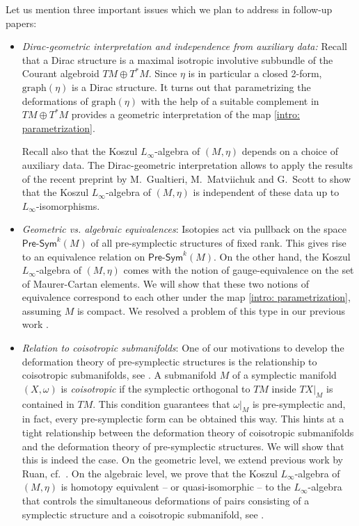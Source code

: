 \documentclass[11pt,thmsa]{amsart}
\theoremstyle{definition}
\newcommand{\Presym}{\mathsf{Pre}\textrm{-}\mathsf{Sym}}
\begin{document}
Let us mention three important issues which we plan to address in follow-up papers:


  
\begin{itemize}

\item {\em Dirac-geometric interpretation and independence from auxiliary data:} 
Recall that a Dirac structure is a  maximal isotropic involutive subbundle of the Courant algebroid $TM\oplus T^*M$. Since $\eta$ is in particular a closed 2-form,   $\mathrm{graph}(\eta)$ is a Dirac structure. It turns out {\cite{SZDirac}} 
that parametrizing the deformations of $\mathrm{graph}(\eta)$  with the help of a suitable complement in $TM\oplus T^*M$ provides a geometric interpretation of the map \eqref{intro: parametrization}. 



Recall also that the Koszul $L_{\infty}$-algebra of $(M,\eta)$  depends on a choice of auxiliary data. {The Dirac-geometric interpretation allows to apply the results of 
the recent preprint \cite{GMS} by M.~Gualtieri, M.~Matviichuk and G.~Scott to show that 
the Koszul $L_{\infty}$-algebra of $(M,\eta)$ is independent of these data up to $L_{\infty}$-isomorphisms.}

 


\item {\em Geometric vs. algebraic equivalences}: Isotopies act via pullback on the space $\Presym^k(M)$ of all pre-symplectic structures of fixed rank. This gives rise to an equivalence relation on $\Presym^k(M)$. On the other hand, the Koszul $L_\infty$-algebra of $(M,\eta)$ comes with the notion of gauge-equivalence on the set of Maurer-Cartan elements. We will show {\cite{SZpreequi}}  
 that these two notions of equivalence correspond to each other under the map \eqref{intro: parametrization}, assuming $M$ is compact.
 We resolved a problem of this type in our previous work \cite{Schaetz-Zambon2}.

\item {\em Relation to coisotropic submanifolds}: One of our motivations to develop the deformation theory of pre-symplectic structures is the relationship to coisotropic submanifolds, see \cite{OP,Schaetz-Zambon,Schaetz-Zambon2,LOTVcoiso}.
A submanifold $M$ of a symplectic manifold $(X,\omega)$ is {\em coisotropic} if the symplectic orthogonal to $TM$ inside $TX\vert_M$ is contained in $TM$. This condition guarantees that $\omega\vert_M$ is pre-symplectic and, in fact, every pre-symplectic form can be obtained this way. This hints at a tight relationship between the deformation theory of coisotropic submanifolds and the deformation theory of pre-symplectic structures.
We will show {\cite{SZcoisopre}} 
that this is indeed the case. On the geometric level, we extend previous work by Ruan, cf.~\cite{Ruan}. On the algebraic level, we prove that the Koszul $L_\infty$-algebra
of $(M,\eta)$ is homotopy equivalent -- or quasi-isomorphic -- to the {$L_{\infty}$-algebra} 
 that controls the simultaneous deformations of pairs consisting of a symplectic structure and a coisotropic submanifold, see \cite{Bandiera-Manetti,FZgeo}.
\end{itemize}
\end{document}
